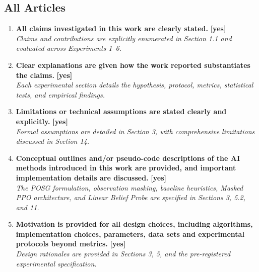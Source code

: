 \documentclass[11pt]{article}
\begin{document}
\subsection*{All Articles}
\begin{enumerate}
  \item \textbf{All claims investigated in this work are clearly stated.} \hfill \textbf{[yes]} \\
  \textit{Claims and contributions are explicitly enumerated in Section 1.1 and evaluated across Experiments 1--6.}
  \item \textbf{Clear explanations are given how the work reported substantiates the claims.} \hfill \textbf{[yes]} \\
  \textit{Each experimental section details the hypothesis, protocol, metrics, statistical tests, and empirical findings.}
  \item \textbf{Limitations or technical assumptions are stated clearly and explicitly.} \hfill \textbf{[yes]} \\
  \textit{Formal assumptions are detailed in Section 3, with comprehensive limitations discussed in Section 14.}
  \item \textbf{Conceptual outlines and/or pseudo-code descriptions of the AI methods introduced in this work are provided, and important implementation details are discussed.} \hfill \textbf{[yes]} \\
  \textit{The POSG formulation, observation masking, baseline heuristics, Masked PPO architecture, and Linear Belief Probe are specified in Sections 3, 5.2, and 11.}
  \item \textbf{Motivation is provided for all design choices, including algorithms, implementation choices, parameters, data sets and experimental protocols beyond metrics.} \hfill \textbf{[yes]} \\
  \textit{Design rationales are provided in Sections 3, 5, and the pre-registered experimental specification.}
\end{enumerate}
\end{document}
